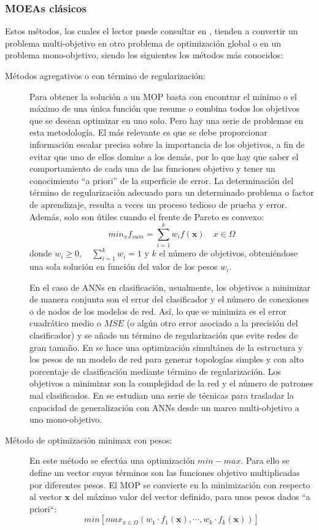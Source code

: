 \subsubsection{MOEAs clásicos}
\noindent Estos métodos, los cuales el lector puede consultar en
\cite{Deb2004,Coello2007}, tienden a convertir un problema multi-objetivo en otro
problema de optimización global o en un problema mono-objetivo, siendo los siguientes los métodos
más conocidos:
\begin{description}
\item [Métodos agregativos o con término de regularización:] Para
obtener la solución a un MOP basta con encontrar el mínimo o el máximo de una única
función que resume o combina todos los objetivos que se desean optimizar en uno solo. Pero
hay una serie de problemas en esta metodología. El más relevante es que se debe
proporcionar información
escalar precisa
sobre la importancia de los objetivos, a fin de evitar que uno de ellos domine a los
demás,
por lo  que  hay  que  saber  el  comportamiento  de  cada  una  de  las funciones
objetivo y tener un conocimiento “a priori” de la superficie de error. La determinación
del término de regularización adecuado para un determinado problema o factor de
aprendizaje, resulta a veces un proceso tedioso de
prueba y error. Además, solo son útiles cuando el frente de Pareto es convexo:
\begin{displaymath}
	min_{x}f_{sum}=\sum_{i=1}^k w_{i}f(\mathbf{x}) \quad x\in \Omega
\end{displaymath}
donde $\displaystyle w_{i}\geq0,\quad \sum_{i=1}^k w_{i}=1$ y $k$ el número de objetivos,
obteniéndose una sola solución en función del valor de los pesos $w_{i}$.

En el caso de ANNs en clasificación, usualmente, los objetivos a minimizar
de manera conjunta son el error
del clasificador y el número de conexiones o de nodos de los modelos de red. Así, lo que
se minimiza es el error cuadrático medio o $MSE$ (o algún otro error asociado
a la precisión del clasificador) y  se añade  un término de regularización que evite
redes
de gran tamaño. En \cite{Ludemir2006} se hace una optimización simultánea de la
estructura y los pesos de un modelo de red para generar topologías simples y con alto
porcentaje de clasificación mediante término de regularización. Los objetivos a minimizar
son la complejidad de la red y el número de patrones mal clasificados. En \cite{Jin2006b}
se estudian una serie de técnicas para trasladar la capacidad de generalización
con ANNs desde un marco multi-objetivo a uno mono-objetivo.
\item [Método de optimización minimax con pesos:] En este método se efectúa una
optimización $min-max$. Para ello se define un vector cuyos términos son las funciones
objetivo multiplicadas por diferentes pesos. El MOP se convierte en la
minimización con respecto al vector $\mathbf{x}$ del máximo valor del vector definido, para unos
pesos dados ``a priori``:
\begin{displaymath}
min\left[ max_{x\in\Omega} \left(w_{1}\cdot f_{1}(\mathbf{x}),\cdots,w_{k}\cdot
f_{k}(\mathbf{x})\right)
\right]
\end{displaymath}


\end{description}
